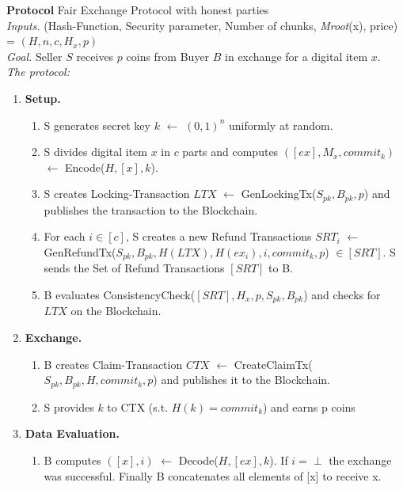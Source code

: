 \documentclass{cacthesis}
\makeatletter
\newcounter{protocol}
\newenvironment{protocol}[1]
  {\par\addvspace{\topsep}
   \noindent
   \tabularx{\linewidth}{@{} X @{}}
    \hline
    \refstepcounter{protocol}\textbf{Protocol \theprotocol} #1 \\
    \hline}
  { \\
    \hline
   \endtabularx
   \par\addvspace{\topsep}}
\newcommand{\sbline}{\\[.5\normalbaselineskip]}%
\makeatother
\begin{document}
        
        \begin{protocol}{Fair Exchange Protocol with honest parties}
        \textit{Inputs.} (Hash-Function, Security parameter, Number of chunks, \textit{Mroot}(x), price) = $(H, n, c, H_x, p)$
        \sbline
        \textit{Goal.} Seller $S$ receives $p$ coins from Buyer $B$ in exchange for a digital item $x$.
        \sbline
        \textit{The protocol:}
        \begin{enumerate}
          \item \textbf{Setup.}
          \begin{enumerate}
            \item S generates secret key $k$ $\leftarrow$ $(0, 1)^n$ uniformly at random.
            
            \item S divides digital item $x$ in $c$ parts and computes $([ex], M_x, commit_k)$ $\leftarrow$ \textsf{Encode($H, [x], k$)}.
            
            \item S creates Locking-Transaction $LTX$ $\leftarrow$ \textsf{GenLockingTx($S_{pk}, B_{pk}, p$)} and publishes the transaction to the Blockchain.
            
            \item For each $i \in [c]$, S creates a new Refund Transactions $SRT_i$ $\leftarrow$ \textsf{GenRefundTx($S_{pk}, B_{pk}, H(LTX), H(ex_i), i, commit_k, p$)} $\in [SRT]$. S sends the Set of Refund Transactions $[SRT]$ to B.
            
            \item B evaluates \textsf{ConsistencyCheck($[SRT], H_x, p, S_{pk}, B_{pk}$)} and checks for $LTX$ on the Blockchain.
          \end{enumerate}
          
          \item \textbf{Exchange.}
          \begin{enumerate}
            \item B creates Claim-Transaction $CTX$ $\leftarrow$ \textsf{CreateClaimTx($S_{pk}, B_{pk}, H, commit_k, p$)} and publishes it to the Blockchain.
            
            \item S provides $k$ to CTX (s.t. $H(k) = commit_k$) and earns p coins
          \end{enumerate}
          
          \item \textbf{Data Evaluation.}
          \begin{enumerate}
            \item B computes $([x], i)$ $\leftarrow$ \textsf{Decode($H, [ex], k$)}. If $i = \perp$ the exchange was successful. Finally B concatenates all elements of [x] to receive x.
          \end{enumerate}
        
        \end{enumerate}
        
        \end{protocol}
        
\end{document}
